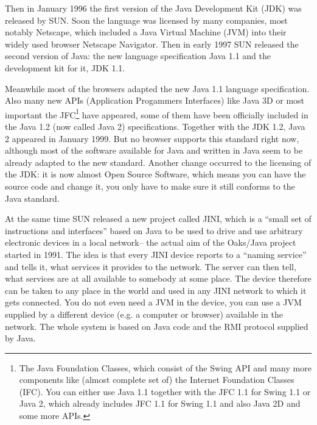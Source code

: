 Then in January 1996 the first version of the Java Development Kit (JDK) 
was released by SUN. Soon the language was licensed by many companies,
most notably Netscape, which included a Java Virtual Machine (JVM) into
their widely used browser Netscape Navigator. Then in early 1997
SUN released the second version of Java: the new language specification 
Java 1.1 and the development kit for it, JDK 1.1.

Meanwhile most of the browsers adapted the new Java 1.1 language specification.
Also many new APIs (Application Progammers Interfaces) like Java 3D or 
most important the JFC\footnote{The Java Foundation Classes, which
consist of the Swing API and many more components like (almost complete set of)  
the Internet Foundation Classes (IFC). You can either use Java 1.1 together
with the JFC 1.1 for Swing 1.1 or Java 2, which already includes JFC 1.1 for
Swing 1.1 and also Java 2D and some more APIs.}
have appeared, some
of them have been officially included in the Java 1.2 (now called Java 2)
specifications. Together with the JDK 1.2, Java 2 appeared in January 1999.
But no browser supports this standard right now, although most
of the software available for Java and written in Java seem to be
already adapted to the new standard. Another change occurred to the
licensing of the JDK: it is now almost Open Source Software, which
means you can have the source code and change it, you only have to make
sure it still conforms to the Java standard.

At the same time SUN released a new project called JINI, which is
a ``small set of instructions and interfaces'' based on Java to
be used to drive and use arbitrary electronic devices in a local network--
the actual aim of the Oaks/Java project started in 1991. The idea is that every 
JINI device reports to a ``naming service'' and tells it, what services
it provides to the network. The server can then tell, what services are at
all available to somebody at some place. The device therefore can be 
taken to any place in the world and used in any JINI network to which
it gets connected. You do not even need a JVM in the device, you can 
use a JVM supplied by a different device (e.g. a computer or browser) 
available in the network. The whole system is based on Java code and
the RMI protocol supplied by Java.




